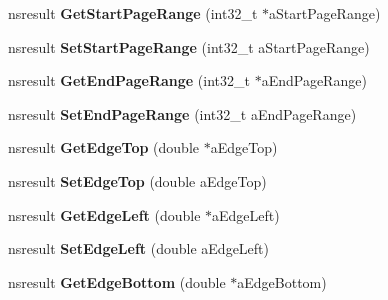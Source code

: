 \begin{DoxyCompactItemize}
\item 
\mbox{\label{interfacens_i_print_settings_ad46709621a17b2a3b24491e684ca39a8}} 
nsresult {\bfseries Get\+Start\+Page\+Range} (int32\+\_\+t $\ast$a\+Start\+Page\+Range)
\item 
\mbox{\label{interfacens_i_print_settings_aacdbbbd9b10681c315257a65b9460a4d}} 
nsresult {\bfseries Set\+Start\+Page\+Range} (int32\+\_\+t a\+Start\+Page\+Range)
\item 
\mbox{\label{interfacens_i_print_settings_a909fce8d6879cef75372d0c62a85e6e3}} 
nsresult {\bfseries Get\+End\+Page\+Range} (int32\+\_\+t $\ast$a\+End\+Page\+Range)
\item 
\mbox{\label{interfacens_i_print_settings_a0112753a0b7f5ddb19561a3203320647}} 
nsresult {\bfseries Set\+End\+Page\+Range} (int32\+\_\+t a\+End\+Page\+Range)
\item 
\mbox{\label{interfacens_i_print_settings_af79aa35786a455e4f8f1e8e6278f9c34}} 
nsresult {\bfseries Get\+Edge\+Top} (double $\ast$a\+Edge\+Top)
\item 
\mbox{\label{interfacens_i_print_settings_a942e35a3300c842550f79c9c2ab31fc5}} 
nsresult {\bfseries Set\+Edge\+Top} (double a\+Edge\+Top)
\item 
\mbox{\label{interfacens_i_print_settings_a0c85970fbc0b5339fc112e7f5490414a}} 
nsresult {\bfseries Get\+Edge\+Left} (double $\ast$a\+Edge\+Left)
\item 
\mbox{\label{interfacens_i_print_settings_a0dc3aec901808c7e7f160540fce0ee97}} 
nsresult {\bfseries Set\+Edge\+Left} (double a\+Edge\+Left)
\item 
\mbox{\label{interfacens_i_print_settings_a4019e35e21936fc58ac7206bfb11b6b2}} 
nsresult {\bfseries Get\+Edge\+Bottom} (double $\ast$a\+Edge\+Bottom)
\item 
\mbox{\label{interfacens_i_print_settings_a1bf4c5ad3471fec8d1486c124773dc51}} 

\end{DoxyCompactItemize}
